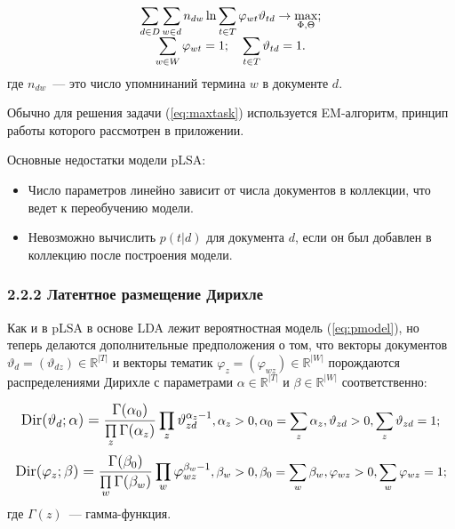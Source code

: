 \documentclass[a4paper]{report}
\begin{document}
	\begin{equation}
		\begin{array}{c c}
		\mathlarger{ 
			\sum_{d \in D} 
			\sum_{w \in d}
			n_{dw} 
			\ln \sum_{t \in T}
			\varphi_{wt} \vartheta_{td} 
			\rightarrow \max_{\Phi, \Theta};
			} \\
		\mathlarger{
			\sum_{w \in W} \varphi_{wt} = 1; \quad \sum_{t \in T} \vartheta_{td} = 1.
		}
		\end{array}
	\label{eq:maxtask}
	\end{equation}
	где $n_{dw}$~--- это число упомнинаний термина $w$ в документе $d$.
	
	Обычно для решения задачи (\ref{eq:maxtask}) используется EM-алгоритм, принцип работы  которого рассмотрен в приложении.
	
	Основные недостатки модели pLSA:
	\begin{itemize}
	\item{Число параметров линейно зависит от числа документов в коллекции, что ведет к переобучению модели.}
	\item{Невозможно вычислить $p(t|d)$ для документа $d$, если он был добавлен в коллекцию после построения модели. \cite{bib:Voron1}  }
	\end{itemize}
	
	
	\subsubsection{2.2.2 Латентное размещение Дирихле}
	
	Как и в pLSA в основе LDA лежит вероятностная модель (\ref{eq:pmodel}), но теперь делаются дополнительные предположения о том, что 
	векторы документов $\vartheta_d = (\vartheta_{dz}) \in \mathbb{R}^{|T|}$ 
	и 
	векторы тематик $\varphi_z = (\varphi_{wz}) \in \mathbb{R}^{|W|}$ 
	порождаются распределениями Дирихле с параметрами 
	$ \alpha \in \mathbb{R}^{|T|} $ 
	и
	$ \beta \in \mathbb{R}^{|W|} $ соответственно:
	
	$$  \mathlarger{
		\text{Dir}(\vartheta_d; \alpha) = 
		\dfrac
			{ \Gamma(\alpha_0)			}
			{ \prod \limits_z \Gamma (\alpha_z) }
		\prod_z \vartheta_{zd}^{\alpha_z - 1}
		},
		\alpha_z > 0, 
		\alpha_0 = \sum_z \alpha_z,
		\vartheta_{zd} > 0, 
		\sum_z \vartheta_{zd} = 1;		
	$$
	$$  \mathlarger{
		\text{Dir}(\varphi_z; \beta) = 
		\dfrac
			{ \Gamma(\beta_0)			}
			{ \prod \limits_w \Gamma (\beta_w) }
		\prod_w \varphi_{wz}^{\beta_w - 1}
		},
		\beta_w > 0, 
		\beta_0 = \sum_w \beta_w,
		\varphi_{wz} > 0, 
		\sum_w \varphi_{wz} = 1;		
	$$
	где $\Gamma (z) $~--- гамма-функция.
	
\end{document}
